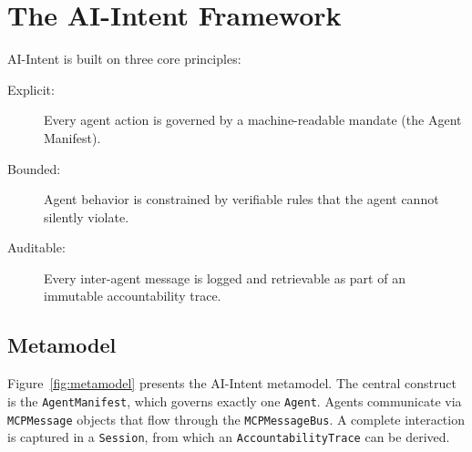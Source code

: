 \documentclass[runningheads]{llncs}
\begin{document}
\section{The AI-Intent Framework}
\label{sec:framework}

AI-Intent is built on three core principles:

\begin{description}
    \item[Explicit:] Every agent action is governed by a machine-readable mandate (the Agent Manifest).
    \item[Bounded:] Agent behavior is constrained by verifiable rules that the agent cannot silently violate.
    \item[Auditable:] Every inter-agent message is logged and retrievable as part of an immutable accountability trace.
\end{description}

\subsection{Metamodel}
\label{sec:metamodel}

Figure~\ref{fig:metamodel} presents the AI-Intent metamodel. The central construct is the \texttt{AgentManifest}, which governs exactly one \texttt{Agent}. Agents communicate via \texttt{MCPMessage} objects that flow through the \texttt{MCPMessageBus}. A complete interaction is captured in a \texttt{Session}, from which an \texttt{AccountabilityTrace} can be derived.
\end{document}
